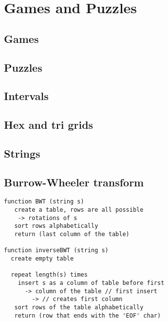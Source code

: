 
\chapter{Games and Puzzles}

\section{Games}
	
\section{Puzzles}

\section{Intervals}

\section{Hex and tri grids}

\section{Strings}

\section{Burrow-Wheeler transform}

\begin{verbatim}
function BWT (string s)
   create a table, rows are all possible
	-> rotations of s
   sort rows alphabetically
   return (last column of the table)
 
function inverseBWT (string s)
  create empty table 
       
  repeat length(s) times
    insert s as a column of table before first
      -> column of the table // first insert
		-> // creates first column
   sort rows of the table alphabetically
   return (row that ends with the 'EOF' char)
\end{verbatim}

